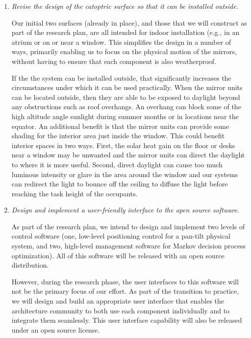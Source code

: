 \documentclass[11pt]{article}
\begin{document}
\begin{enumerate}

\item \emph{Revise the design of the catoptric surface so that it can
be installed outside.}

Our initial two surfaces (already in place),
and those that we will construct as part of the research plan,
are all intended for indoor installation (e.g., in an atrium
or on or near a window.  This simplifies the design in a number of ways,
primarily enabling us to focus on the physical motion of the mirrors, without
having to ensure that each component is also weatherproof.

If the the system can be installed outside, that significantly increases
the circumstances under which it can be used practically.
When the mirror units can be located outside, then they are able to
be exposed to daylight beyond any obstructions such as roof overhangs.
An overhang can block some of the high altitude angle sunlight during
summer months or in locations near the equator.
An additional benefit is that the mirror units can provide some
shading for the interior area just inside the window.
This could benefit interior spaces in two ways.
First, the solar heat gain on the floor or desks near a window
may be unwanted and the mirror units can direct the daylight to
where it is more useful.
Second, direct daylight can cause too much luminous intensity or
glare in the area around the window and our systems can redirect
the light to bounce off the ceiling to diffuse the light before
reaching the task height of the occupants. 

\item \emph{Design and implement a user-friendly interface to the
open source software.}

As part of the research plan, we intend to design and implement two
levels of control software (one, low-level positioning control for a
pan-tilt physical system, and two, high-level management software for
Markov decision process optimization).  All of this software will be
released with an open source distribution.

However, during the research phase, the user interfaces to this software
will not be the primary focus of our effort.  As part of the transition
to practice, we will design and build an appropriate user interface that
enables the architecture community to both use each component individually
and to integrate them seamlessly.  This user interface capability will
also be released under an open source license.


\end{enumerate}
\end{document}
